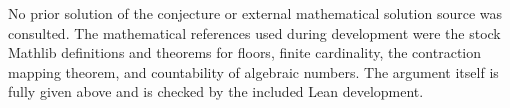 \documentclass[11pt]{article}
\begin{document}
No prior solution of the conjecture or external mathematical solution source was consulted. The mathematical references used during development were the stock Mathlib definitions and theorems for floors, finite cardinality, the contraction mapping theorem, and countability of algebraic numbers. The argument itself is fully given above and is checked by the included Lean development.
\end{document}
